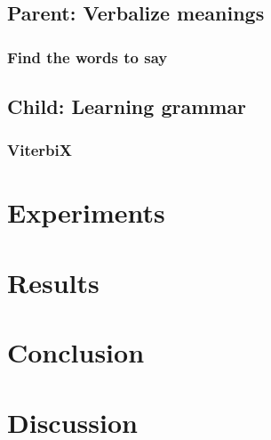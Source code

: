 \documentclass[a4paper]{article}
\begin{document}
\subsection{Parent: Verbalize meanings}
\subsubsection{Find the words to say}
\subsection{Child: Learning grammar} %
\subsubsection{ViterbiX} %
\section{Experiments}
\label{sec:experiments}
\section{Results}
\label{sec:results}
\section{Conclusion}
\label{sec:conclusion}
\section{Discussion}
\label{sec:discussion}



\end{document}
